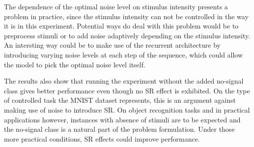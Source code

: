 \documentclass{article}
\begin{document}
The dependence of the optimal noise level on stimulus intensity presents a problem in practice, since the stimulus intensity can not be controlled in the way it is in this experiment. Potential ways do deal with this problem would be to preprocess stimuli or to add noise adaptively depending on the stimulus intensity. An intersting way could be to make use of the recurrent architecture by introducing varying noise levels at each step of the sequence, which could allow the model to pick the optimal noise level itself.

The results also show that running the experiment without the added no-signal class gives better performance even though no SR effect is exhibited. On the type of controlled task the MNIST dataset represents, this is an argument against making use of noise to introduce SR. On object recognition tasks and in practical applications however, instances with absence of stimuli are to be expected and the no-signal class is a natural part of the problem formulation. Under those more practical conditions, SR effects could improve performance.



\printbibliography
\end{document}
